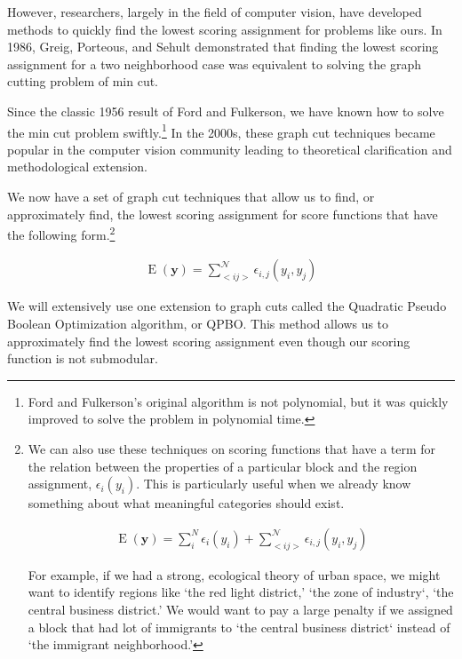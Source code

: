 However, researchers, largely in the field of computer vision, have
developed methods to quickly find the lowest scoring assignment for
problems like ours. In 1986, Greig, Porteous, and Sehult demonstrated
that finding the lowest scoring assignment for a two neighborhood case
was equivalent to solving the graph cutting problem of min
cut.\cite{greig_exact_1989}

 Since the classic 1956 result of Ford and Fulkerson, we have known
 how to solve the min cut problem swiftly.\footnote{Ford and Fulkerson's
   original algorithm is not polynomial, but it was quickly improved
   to solve the problem in polynomial time.\cite{ford_maximal_1956}}
 In the 2000s, these graph cut techniques became popular in the
 computer vision community leading to theoretical
 clarification and methodological extension.\cite{kolmogorov_what_2004}

We now have a set of graph cut techniques that allow us to find, or
approximately find, the lowest scoring assignment for score functions
that have the following form.\footnote{We can also use these
  techniques on scoring functions that have a term for the relation
  between the properties of a particular block and the region
  assignment, $\epsilon_i(y_i)$. This is particularly useful when we
  already know something about what meaningful categories should exist.

  \begin{align}
    \operatorname{E}(\mathbf{y}) = \sum_i^N\epsilon_i(y_i) + \sum_{<i j>}^{\mathcal{N}}\epsilon_{i,j}(y_i,y_j)
  \end{align}

  For example, if we had a strong, ecological theory of urban space,
  we might want to identify regions like `the red light district,'
  `the zone of industry`, `the central business district.' We would
  want to pay a large penalty if we assigned a block that had lot of
  immigrants to `the central business district` instead of `the
  immigrant neighborhood.'
}

\begin{align}
\operatorname{E}(\mathbf{y}) = \sum_{<i j>}^{\mathcal{N}}\epsilon_{i,j}(y_i,y_j)
\end{align}

We will extensively use one extension to graph cuts called the
Quadratic Pseudo Boolean Optimization algorithm, or QPBO. This method
allows us to approximately find the lowest scoring assignment even
though our scoring function is not submodular. 

